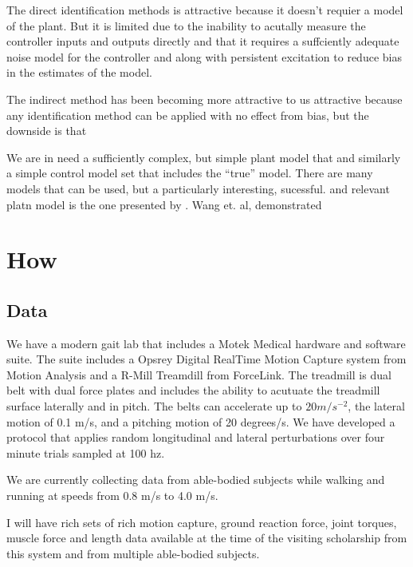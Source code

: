 \documentclass[11pt]{article}
\begin{document}
The direct identification methods is attractive because it doesn't requier a
model of the plant. But it is limited due to the inability to acutally measure
the controller inputs and outputs directly and that it requires a suffciently
adequate noise model for the controller and along with persistent excitation to
reduce bias in the estimates of the model.

The indirect method has been becoming more attractive to us attractive because
any identification method can be applied with no effect from bias, but the
downside is that 

We are in need a sufficiently complex, but simple plant model that and
similarly a simple control model set that includes the ``true'' model. There
are many models that can be used, but a particularly interesting, sucessful.
and relevant platn model is the one presented by \cite{Wang2012}. Wang et. al,
demonstrated 

\section{How}

\subsection{Data}

We have a modern gait lab that includes a Motek Medical hardware and software
suite. The suite includes a Opsrey Digital RealTime Motion Capture system from
Motion Analysis and a R-Mill Treamdill from ForceLink. The treadmill is dual
belt with dual force plates and includes the ability to acutuate the treadmill
surface laterally and in pitch. The belts can accelerate up to $20 m/s^{-2}$,
the lateral motion of 0.1 m/s, and a pitching motion of 20 degrees/s. We have
developed a protocol that applies random longitudinal and lateral perturbations
over four minute trials sampled at 100 hz.


We are currently collecting data from able-bodied subjects while walking and
running at speeds from 0.8 m/s to 4.0 m/s.


I will have rich sets of rich motion capture, ground reaction force, joint
torques, muscle force and length data available at the time of the visiting
scholarship from this system and from multiple able-bodied subjects.
\end{document}
